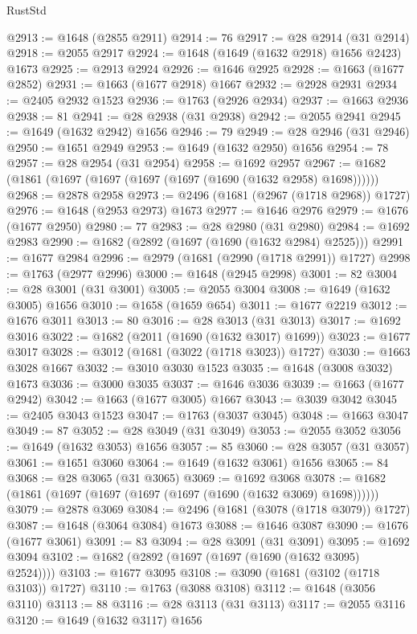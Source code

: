 \begin{lexlean}{RustStd}
\begin{coremodule}
{\begin{coremodule}
{{{{{{{{{{{{{{{{{{{{{{{{{{{{{{{{{{{{{{{{{{{{@2913 := @1648 (@2855 @2911)
@2914 := 76
@2917 := @28 @2914 (@31 @2914)
@2918 := @2055 @2917
@2924 := @1648 (@1649 (@1632 @2918) @1656 @2423) @1673
@2925 := @2913 @2924
@2926 := @1646 @2925
@2928 := @1663 (@1677 @2852)
@2931 := @1663 (@1677 @2918) @1667
@2932 := @2928 @2931
@2934 := @2405 @2932 @1523
@2936 := @1763 (@2926 @2934)
@2937 := @1663 @2936
@2938 := 81
@2941 := @28 @2938 (@31 @2938)
@2942 := @2055 @2941
@2945 := @1649 (@1632 @2942) @1656
@2946 := 79
@2949 := @28 @2946 (@31 @2946)
@2950 := @1651 @2949
@2953 := @1649 (@1632 @2950) @1656
@2954 := 78
@2957 := @28 @2954 (@31 @2954)
@2958 := @1692 @2957
@2967 := @1682 (@1861 (@1697 (@1697 (@1697 (@1697 (@1690 (@1632 @2958) @1698))))))
@2968 := @2878 @2958
@2973 := @2496 (@1681 (@2967 (@1718 @2968)) @1727)
@2976 := @1648 (@2953 @2973) @1673
@2977 := @1646 @2976
@2979 := @1676 (@1677 @2950)
@2980 := 77
@2983 := @28 @2980 (@31 @2980)
@2984 := @1692 @2983
@2990 := @1682 (@2892 (@1697 (@1690 (@1632 @2984) @2525)))
@2991 := @1677 @2984
@2996 := @2979 (@1681 (@2990 (@1718 @2991)) @1727)
@2998 := @1763 (@2977 @2996)
@3000 := @1648 (@2945 @2998)
@3001 := 82
@3004 := @28 @3001 (@31 @3001)
@3005 := @2055 @3004
@3008 := @1649 (@1632 @3005) @1656
@3010 := @1658 (@1659 @654)
@3011 := @1677 @2219
@3012 := @1676 @3011
@3013 := 80
@3016 := @28 @3013 (@31 @3013)
@3017 := @1692 @3016
@3022 := @1682 (@2011 (@1690 (@1632 @3017) @1699))
@3023 := @1677 @3017
@3028 := @3012 (@1681 (@3022 (@1718 @3023)) @1727)
@3030 := @1663 @3028 @1667
@3032 := @3010 @3030 @1523
@3035 := @1648 (@3008 @3032) @1673
@3036 := @3000 @3035
@3037 := @1646 @3036
@3039 := @1663 (@1677 @2942)
@3042 := @1663 (@1677 @3005) @1667
@3043 := @3039 @3042
@3045 := @2405 @3043 @1523
@3047 := @1763 (@3037 @3045)
@3048 := @1663 @3047
@3049 := 87
@3052 := @28 @3049 (@31 @3049)
@3053 := @2055 @3052
@3056 := @1649 (@1632 @3053) @1656
@3057 := 85
@3060 := @28 @3057 (@31 @3057)
@3061 := @1651 @3060
@3064 := @1649 (@1632 @3061) @1656
@3065 := 84
@3068 := @28 @3065 (@31 @3065)
@3069 := @1692 @3068
@3078 := @1682 (@1861 (@1697 (@1697 (@1697 (@1697 (@1690 (@1632 @3069) @1698))))))
@3079 := @2878 @3069
@3084 := @2496 (@1681 (@3078 (@1718 @3079)) @1727)
@3087 := @1648 (@3064 @3084) @1673
@3088 := @1646 @3087
@3090 := @1676 (@1677 @3061)
@3091 := 83
@3094 := @28 @3091 (@31 @3091)
@3095 := @1692 @3094
@3102 := @1682 (@2892 (@1697 (@1697 (@1690 (@1632 @3095) @2524))))
@3103 := @1677 @3095
@3108 := @3090 (@1681 (@3102 (@1718 @3103)) @1727)
@3110 := @1763 (@3088 @3108)
@3112 := @1648 (@3056 @3110)
@3113 := 88
@3116 := @28 @3113 (@31 @3113)
@3117 := @2055 @3116
@3120 := @1649 (@1632 @3117) @1656
}}}}}}}}}}}}}}}}}}}}}}}}}}}}}}}}}}}}}}}}}}}}
\end{coremodule}}
\end{coremodule}
\end{lexlean}
